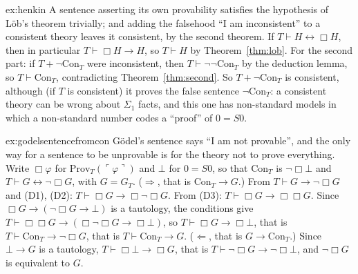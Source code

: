\begin{solution}{ex:henkin}
\idea A sentence asserting its own provability satisfies the hypothesis of Löb's theorem trivially; and adding the falsehood ``I am inconsistent'' to a consistent theory leaves it consistent, by the second theorem.
\writeup If $T\vdash H\leftrightarrow\Box H$, then in particular $T\vdash\Box H\to H$, so $T\vdash H$ by Theorem~\ref{thm:lob}. For the second part: if $T+\neg\mathrm{Con}_T$ were inconsistent, then $T\vdash\neg\neg\mathrm{Con}_T$ by the deduction lemma, so $T\vdash\mathrm{Con}_T$, contradicting Theorem~\ref{thm:second}. So $T+\neg\mathrm{Con}_T$ is consistent, although (if $T$ is consistent) it proves the false sentence $\neg\mathrm{Con}_T$: a consistent theory can be wrong about $\Sigma_1$ facts, and this one has non-standard models in which a non-standard number codes a ``proof'' of $0=S0$.
\end{solution}

\begin{solution}{ex:godelsentencefromcon}
\idea Gödel's sentence says ``I am not provable'', and the only way for a sentence to be unprovable is for the theory not to prove everything.
\writeup Write $\Box\varphi$ for $\mathrm{Prov}_T(\ulcorner\varphi\urcorner)$ and $\bot$ for $0=S0$, so that $\mathrm{Con}_T$ is $\neg\Box\bot$ and $T\vdash G\leftrightarrow\neg\Box G$, with $G=G_T$. ($\Rightarrow$, that is $\mathrm{Con}_T\to G$.) From $T\vdash G\to\neg\Box G$ and (D1), (D2): $T\vdash\Box G\to\Box\neg\Box G$. From (D3): $T\vdash\Box G\to\Box\Box G$. Since $\Box G\to(\neg\Box G\to\bot)$ is a tautology, the conditions give $T\vdash\Box\Box G\to(\Box\neg\Box G\to\Box\bot)$, so $T\vdash\Box G\to\Box\bot$, that is $T\vdash\mathrm{Con}_T\to\neg\Box G$, that is $T\vdash\mathrm{Con}_T\to G$. ($\Leftarrow$, that is $G\to\mathrm{Con}_T$.) Since $\bot\to G$ is a tautology, $T\vdash\Box\bot\to\Box G$, that is $T\vdash\neg\Box G\to\neg\Box\bot$, and $\neg\Box G$ is equivalent to $G$.
\end{solution}

